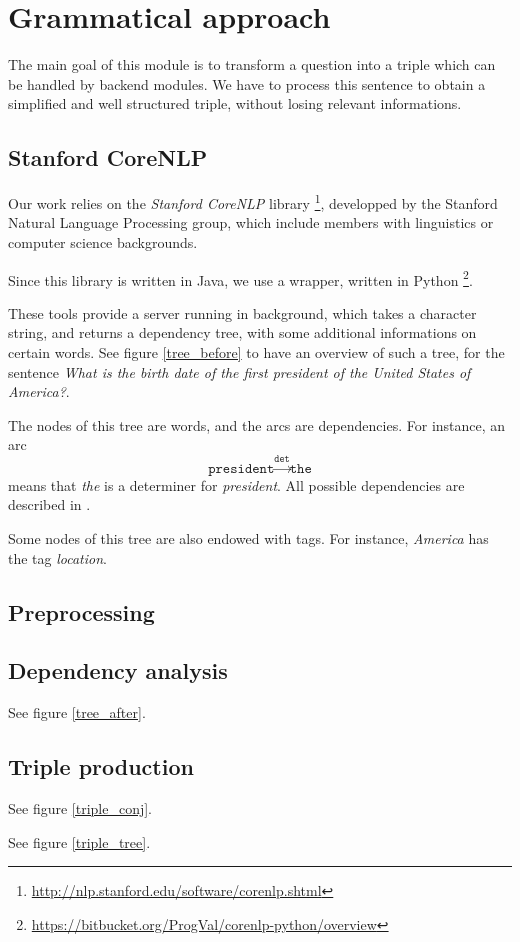 \section{Grammatical approach}

The main goal of this module is to transform a question into a triple which can
be handled by backend modules. We have to process this sentence to obtain a simplified
and well structured triple, without losing relevant informations.

\subsection{Stanford CoreNLP}

Our work relies on the \emph{Stanford CoreNLP} library
\footnote{\url{http://nlp.stanford.edu/software/corenlp.shtml}}, developped by
the Stanford Natural Language Processing group, which include members with 
linguistics or computer science backgrounds. 

Since this library is written in Java, we use a wrapper, written in Python
\footnote{\url{https://bitbucket.org/ProgVal/corenlp-python/overview}}.

These tools provide a server running in background, which takes a character string,
and returns a dependency tree, with some additional informations on certain words.
See figure \ref{tree_before} to have an overview of such a tree, for the sentence
\emph{What is the birth date of the first president of the United States of America?}.

The nodes of this tree are words, and the arcs are dependencies. For instance,
an arc $$\texttt{president}\xrightarrow{\texttt{det}}\texttt{the}$$ means that
\emph{the} is a determiner for \emph{president}. All possible dependencies are 
described in \cite{stanfordDep}. 

Some nodes of this tree are also endowed with tags. For instance, \emph{America}
has the tag \emph{location}.


\subsection{Preprocessing}


\subsection{Dependency analysis}

See figure \ref{tree_after}.


\subsection{Triple production}

See figure \ref{triple_conj}.

See figure \ref{triple_tree}.

